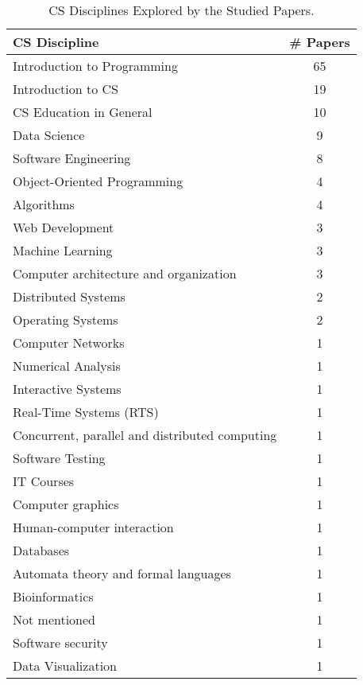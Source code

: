 \begin{table}[ht]
    \footnotesize
    \centering
    \caption{CS Disciplines Explored by the Studied Papers.}
    \begin{tabular}{@{}l c@{}}
        \toprule
        \textbf{CS Discipline} & \textbf{\# Papers} \\
        \midrule
		Introduction to Programming & 65 \\
		Introduction to CS & 19 \\
		CS Education in General & 10 \\
		Data Science & 9 \\
		Software Engineering & 8 \\
		Object-Oriented Programming & 4 \\
		Algorithms & 4 \\
		Web Development & 3 \\
		Machine Learning & 3 \\
		Computer architecture and organization & 3 \\
		Distributed Systems & 2 \\
		Operating Systems & 2 \\
		Computer Networks & 1 \\
		Numerical Analysis & 1 \\
		Interactive Systems & 1 \\
		Real-Time Systems (RTS) & 1 \\
		Concurrent, parallel and distributed computing & 1 \\
		Software Testing & 1 \\
		IT Courses & 1 \\
		Computer graphics & 1 \\
		Human-computer interaction & 1 \\
		Databases & 1 \\
		Automata theory and formal languages & 1 \\
		Bioinformatics & 1 \\
		Not mentioned & 1 \\
		Software security & 1 \\
		Data Visualization & 1 \\
	\bottomrule
    \end{tabular}
    \label{tab:disciplines}
\end{table}
